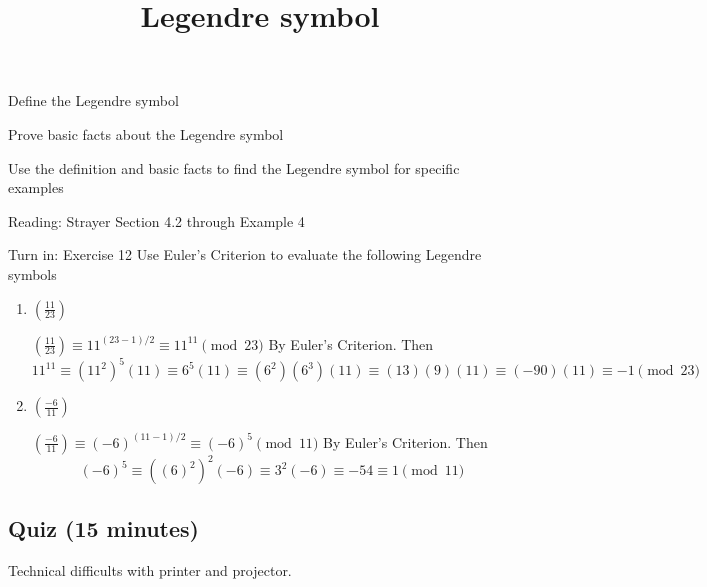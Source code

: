 \documentclass{../ximera}
\title{Legendre symbol}
\begin{document}
\begin{abstract}
\end{abstract}
\maketitle


\begin{obj}
    \item Define the Legendre symbol
    \item Prove basic facts about the Legendre symbol
    \item Use the definition and basic facts to find the Legendre symbol for specific examples
\end{obj}


\begin{pre}
    \item[Reading:] Strayer Section 4.2 through Example 4
    \item[Turn in:] Exercise 12
     Use Euler's Criterion to evaluate the following Legendre symbols 
	\begin{enumerate}
 		\item $\left(\frac{11}{23}\right)$
		
		\begin{solution}
 			$\left(\frac{11}{23}\right)\equiv 11^{(23-1)/2}\equiv 11^{11}\pmod{23}$ By Euler's Criterion. Then
			\[11^{11}\equiv (11^{2})^{5}(11)\equiv 6^5(11)\equiv (6^2)(6^3)(11)\equiv (13)(9)(11)\equiv(-90)(11)\equiv -1\pmod{23}\]
		\end{solution}
		
		\item $\left(\frac{-6}{11}\right)$
		
		\begin{solution}
 			$\left(\frac{-6}{11}\right)\equiv (-6)^{(11-1)/2}\equiv (-6)^{5}\pmod{11}$ By Euler's Criterion. Then
			\[(-6)^{5}\equiv ((6)^{2})^{2}(-6)\equiv 3^2(-6)\equiv -54 \equiv 1\pmod{11}\]
		\end{solution}
	\end{enumerate}
 

    \end{pre}


\subsection{Quiz (15 minutes)}
Technical difficults with printer and projector.
\end{document}
